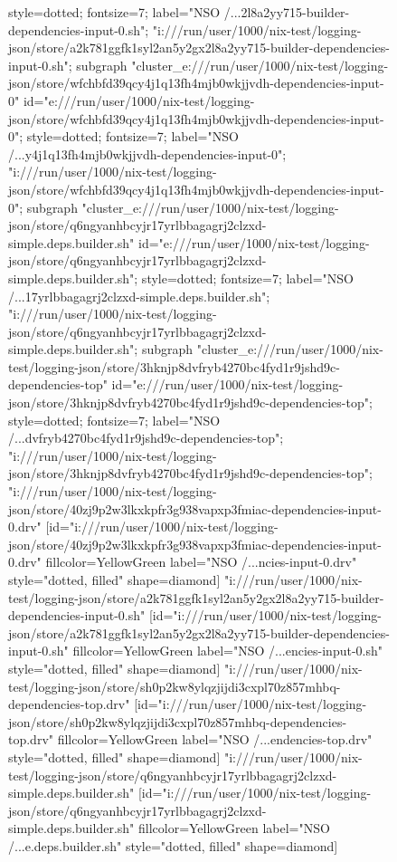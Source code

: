 \begin{figure}[p]
\begin{sideways}
{{style=dotted;
fontsize=7;
label="NSO /...2l8a2yy715-builder-dependencies-input-0.sh";
"i:///run/user/1000/nix-test/logging-json/store/a2k781ggfk1syl2an5y2gx2l8a2yy715-builder-dependencies-input-0.sh";
}
subgraph "cluster_e:///run/user/1000/nix-test/logging-json/store/wfchbfd39qcy4j1q13fh4mjb0wkjjvdh-dependencies-input-0" {
id="e:///run/user/1000/nix-test/logging-json/store/wfchbfd39qcy4j1q13fh4mjb0wkjjvdh-dependencies-input-0";
style=dotted;
fontsize=7;
label="NSO /...y4j1q13fh4mjb0wkjjvdh-dependencies-input-0";
"i:///run/user/1000/nix-test/logging-json/store/wfchbfd39qcy4j1q13fh4mjb0wkjjvdh-dependencies-input-0";
}
subgraph "cluster_e:///run/user/1000/nix-test/logging-json/store/q6ngyanhbcyjr17yrlbbagagrj2clzxd-simple.deps.builder.sh" {
id="e:///run/user/1000/nix-test/logging-json/store/q6ngyanhbcyjr17yrlbbagagrj2clzxd-simple.deps.builder.sh";
style=dotted;
fontsize=7;
label="NSO /...17yrlbbagagrj2clzxd-simple.deps.builder.sh";
"i:///run/user/1000/nix-test/logging-json/store/q6ngyanhbcyjr17yrlbbagagrj2clzxd-simple.deps.builder.sh";
}
subgraph "cluster_e:///run/user/1000/nix-test/logging-json/store/3hknjp8dvfryb4270bc4fyd1r9jshd9c-dependencies-top" {
id="e:///run/user/1000/nix-test/logging-json/store/3hknjp8dvfryb4270bc4fyd1r9jshd9c-dependencies-top";
style=dotted;
fontsize=7;
label="NSO /...dvfryb4270bc4fyd1r9jshd9c-dependencies-top";
"i:///run/user/1000/nix-test/logging-json/store/3hknjp8dvfryb4270bc4fyd1r9jshd9c-dependencies-top";
}
"i:///run/user/1000/nix-test/logging-json/store/40zj9p2w3lkxkpfr3g938vapxp3fmiac-dependencies-input-0.drv" [id="i:///run/user/1000/nix-test/logging-json/store/40zj9p2w3lkxkpfr3g938vapxp3fmiac-dependencies-input-0.drv" fillcolor=YellowGreen label="NSO /...ncies-input-0.drv" style="dotted, filled" shape=diamond]
"i:///run/user/1000/nix-test/logging-json/store/a2k781ggfk1syl2an5y2gx2l8a2yy715-builder-dependencies-input-0.sh" [id="i:///run/user/1000/nix-test/logging-json/store/a2k781ggfk1syl2an5y2gx2l8a2yy715-builder-dependencies-input-0.sh" fillcolor=YellowGreen label="NSO /...encies-input-0.sh" style="dotted, filled" shape=diamond]
"i:///run/user/1000/nix-test/logging-json/store/sh0p2kw8ylqzjijdi3cxpl70z857mhbq-dependencies-top.drv" [id="i:///run/user/1000/nix-test/logging-json/store/sh0p2kw8ylqzjijdi3cxpl70z857mhbq-dependencies-top.drv" fillcolor=YellowGreen label="NSO /...endencies-top.drv" style="dotted, filled" shape=diamond]
"i:///run/user/1000/nix-test/logging-json/store/q6ngyanhbcyjr17yrlbbagagrj2clzxd-simple.deps.builder.sh" [id="i:///run/user/1000/nix-test/logging-json/store/q6ngyanhbcyjr17yrlbbagagrj2clzxd-simple.deps.builder.sh" fillcolor=YellowGreen label="NSO /...e.deps.builder.sh" style="dotted, filled" shape=diamond]
}
\end{sideways}
\end{figure}
